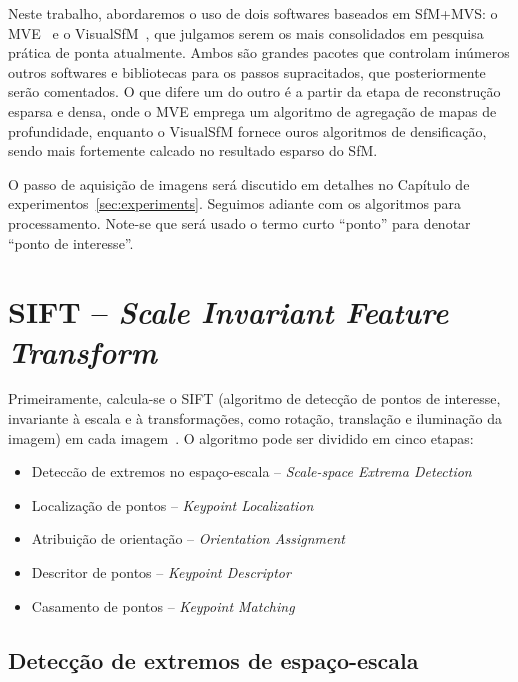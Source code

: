 Neste trabalho, abordaremos o uso de dois softwares baseados em SfM+MVS: o
MVE~\cite{mve} e o VisualSfM~\cite{wu2011visualsfm}, que julgamos serem os mais
consolidados em pesquisa prática de ponta atualmente. Ambos são grandes pacotes
que controlam inúmeros outros softwares e bibliotecas para os passos
supracitados, que posteriormente serão comentados. O que difere um do outro é a
partir da etapa de reconstrução esparsa e densa, onde o MVE emprega um algoritmo
de agregação de mapas de profundidade, enquanto o VisualSfM fornece ouros
algoritmos de densificação, sendo mais fortemente calcado no resultado esparso do SfM.

O passo de aquisição de imagens será discutido em detalhes no Capítulo de
experimentos~\ref{sec:experiments}. Seguimos adiante com os algoritmos para
processamento. Note-se que será usado o termo curto ``ponto'' para denotar
``ponto de interesse''.

\section*{SIFT -- \emph{Scale Invariant Feature Transform}}

Primeiramente, calcula-se o SIFT (algoritmo de detecção de pontos de interesse,
invariante à escala e à transformações, como rotação, translação e iluminação da
imagem) em cada imagem~\cite{Lowe:IJCV2004}.
O algoritmo pode ser dividido em cinco etapas:

\begin{itemize}
	\item{Deteccão de extremos no espaço-escala -- \emph{Scale-space Extrema Detection}}
	\item{Localização de pontos -- \emph{Keypoint Localization}}
	\item{Atribuição de orientação -- \emph{Orientation Assignment}}
	\item{Descritor de pontos -- \emph{Keypoint Descriptor}}
	\item{Casamento de pontos -- \emph{Keypoint Matching}}
\end{itemize}


\subsection*{Detecção de extremos de espaço-escala}\label{DiffGaussian}


